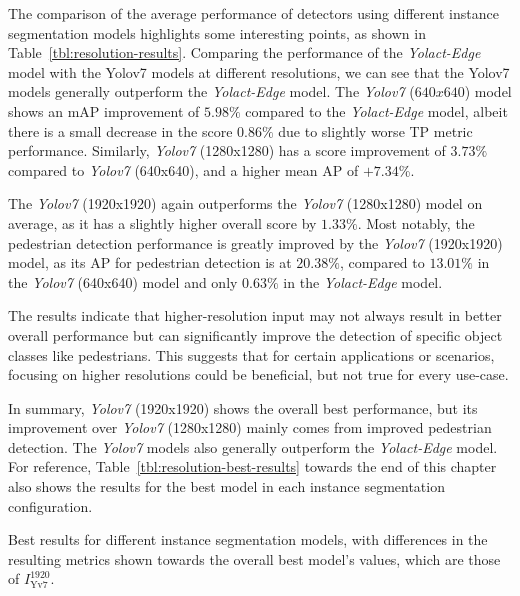The comparison of the average performance of detectors using different instance segmentation models highlights some interesting points, as shown in Table~\ref{tbl:resolution-results}.
Comparing the performance of the \textit{Yolact-Edge} model with the Yolov7 models at different resolutions, we can see that the Yolov7 models generally outperform the \textit{Yolact-Edge} model.
The \textit{Yolov7} ($640x640$) model shows an mAP improvement of $5.98\%$ compared to the \textit{Yolact-Edge} model, albeit there is a small decrease in the score $0.86\%$ due to slightly worse TP metric performance.
Similarly, \textit{Yolov7} (1280x1280) has a score improvement of $3.73\%$ compared to \textit{Yolov7} (640x640), and a higher mean AP of $+7.34$\%.

The \textit{Yolov7} (1920x1920) again outperforms the \textit{Yolov7} (1280x1280) model on average, as it has a slightly higher overall score by $1.33\%$.
Most notably, the pedestrian detection performance is greatly improved by the \textit{Yolov7} (1920x1920) model, as its AP for pedestrian detection is at $20.38\%$, compared to $13.01\%$ in the \textit{Yolov7} (640x640) model and only $0.63\%$ in the \textit{Yolact-Edge} model.

The results indicate that higher-resolution input may not always result in better overall performance but can significantly improve the detection of specific object classes like pedestrians.
This suggests that for certain applications or scenarios, focusing on higher resolutions could be beneficial, but not true for every use-case.

In summary, \textit{Yolov7} (1920x1920) shows the overall best performance, but its improvement over \textit{Yolov7} (1280x1280) mainly comes from improved pedestrian detection.
The \textit{Yolov7} models also generally outperform the \textit{Yolact-Edge} model.
For reference, Table~\ref{tbl:resolution-best-results} towards the end of this chapter also shows the results for the best model in each instance segmentation configuration.

\begin{table}[htbp]
    
    \caption{Best results for different instance segmentation models, with differences in the resulting metrics shown towards the overall best model's values, which are those of $I^{1920}_\text{Yv7}$.}
    \label{tbl:resolution-best-results}
\end{table}


